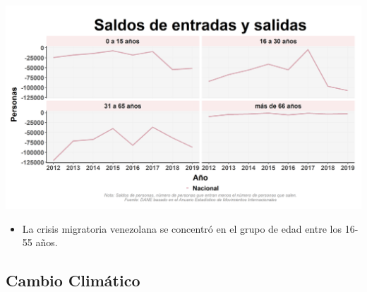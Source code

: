 \documentclass[aspectratio=169]{beamer}
\begin{document}
    \begin{slide}{10} 
                      \begin{imagecolumn}
                \includegraphics[width=\columnwidth]{img/var_238_trend.png}
            \end{imagecolumn}
            \begin{textcolumn}
                \begin{itemize}
                    \item La crisis migratoria venezolana se concentró en el grupo de edad entre los 16-55 años.
                \end{itemize}
            \end{textcolumn}

    \printcolumns
    \end{slide}
    
    \subsection{Cambio Climático}
    
\end{document}
